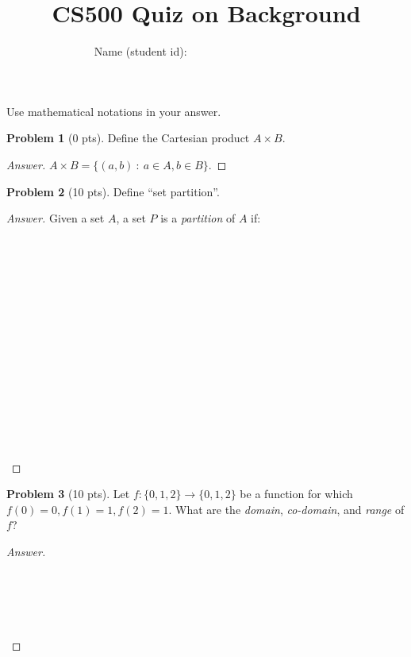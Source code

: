 \documentclass[11pt,a4paper,oneside,microtype,nokorean]{oblivoir}
\theoremstyle{definition}
\newtheorem{problem}{Problem}
\begin{document}
\title{CS500 Quiz on Background}
\author{Name (student id): \ \ \ \ \ \ \ \ \ \ \ \ \ \ \ \ \ \ \ \ \ \ \ }
\maketitle

\noindent Use mathematical notations in your answer.

\begin{problem}[0 pts]
  Define the Cartesian product $A \times B$.
\end{problem}
\begin{proof}[Answer]
  $A \times B = \{(a,b)~:~a \in A, b \in B\}$.
\end{proof}


\begin{problem}[10 pts]
  Define ``set partition''.
\end{problem}
\begin{proof}[Answer]
  Given a set $A$, a set $P$ is a \emph{partition} of $A$ if:
  \\
  \\
  \\
  \\
  \\
  \\
  \\
  \\
  \\
  \\
  \\
  \\
  \\
  \\
  \\
  \\
\end{proof}


\begin{problem}[10 pts]
  Let $f: \{0,1,2\} \to \{0,1,2\}$ be a function for which $f(0) = 0, f(1) = 1, f(2) = 1$.  What are
  the \emph{domain}, \emph{co-domain}, and \emph{range} of $f$?
\end{problem}
\begin{proof}[Answer]
  \ 
  \\
  \\
  \\
  \\
  \\
  \\
\end{proof}
\end{document}
